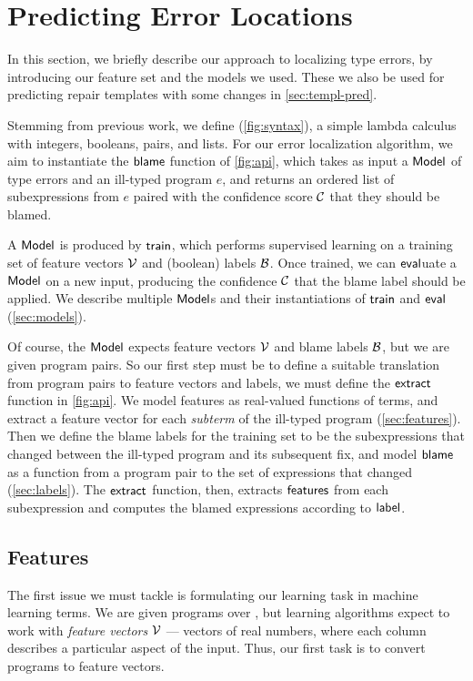 
\section{Predicting Error Locations}
\label{sec:localization}

In this section, we briefly describe our approach to localizing type errors, by
introducing our feature set and the models we used. These we also be used for
predicting repair templates with some changes in \autoref{sec:templ-pred}.

Stemming from previous work, we define \lang (\autoref{fig:syntax}), a simple
lambda calculus with integers, booleans, pairs, and lists. For our error
localization algorithm, we aim to instantiate the $\mathsf{blame}$ function of
\autoref{fig:api}, which takes as input a $\mathsf{Model}$ of type errors and an
ill-typed program $e$, and returns an ordered list of subexpressions from $e$
paired with the confidence score $\mathcal{C}$ that they should be blamed.

A $\mathsf{Model}$ is produced by $\mathsf{train}$, which performs supervised learning on a
training set of feature vectors $\mathcal{V}$ and (boolean) labels $\mathcal{B}$. Once trained, we
can $\mathsf{eval}$uate a $\mathsf{Model}$ on a new input, producing the confidence $\mathcal{C}$
that the blame label should be applied. We describe multiple $\mathsf{Model}$s and their
instantiations of $\mathsf{train}$ and $\mathsf{eval}$ (\autoref{sec:models}).

Of course, the $\mathsf{Model}$ expects feature vectors $\mathcal{V}$ and blame labels $\mathcal{B}$, but
we are given program pairs. So our first step must be to define a suitable
translation from program pairs to feature vectors and labels, \ie we must define
the $\mathsf{extract}$ function in \autoref{fig:api}. We model features as
real-valued functions of terms, and extract a feature vector for each
\emph{subterm} of the ill-typed program (\autoref{sec:features}). Then we define
the blame labels for the training set to be the subexpressions that changed
between the ill-typed program and its subsequent fix, and model $\mathsf{blame}$ as a
function from a program pair to the set of expressions that changed
(\autoref{sec:labels}). The $\mathsf{extract}$ function, then, extracts $\mathsf{features}$
from each subexpression and computes the blamed expressions according to
$\mathsf{label}$.



\subsection{Features}
\label{sec:features}
The first issue we must tackle is formulating our learning task in machine
learning terms. We are given programs over \lang, but learning algorithms expect
to work with \emph{feature vectors} $\mathcal{V}$ --- vectors of real numbers, where each
column describes a particular aspect of the input. Thus, our first task is to
convert programs to feature vectors.

